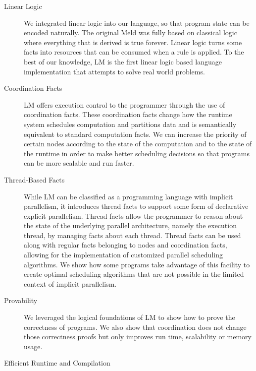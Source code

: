 \begin{description}
   
   \item[Linear Logic]

   We integrated linear logic into our language, so that program state can be
   encoded naturally. The original Meld was fully based on classical logic where
   everything that is derived is true forever. Linear logic turns some facts
   into resources that can be consumed when a rule is applied.  To the best of
   our knowledge, LM is the first linear logic based language implementation
   that attempts to solve real world problems.

   \item[Coordination Facts]
   
   LM offers execution control to the programmer through the use of coordination
   facts. These coordination facts change how the runtime system schedules
   computation and partitions data and is semantically equivalent to standard
   computation facts. We can increase the priority of certain nodes according
   to the state of the computation and to the state of the runtime in order to
   make better scheduling decisions so that programs can be more scalable and
   run faster.

   \item[Thread-Based Facts]

   While LM can be classified as a programming language with implicit
   parallelism, it introduces thread facts to support some form of declarative
   explicit parallelism. Thread facts allow the programmer to reason about the
   state of the underlying parallel architecture, namely the execution thread,
   by managing facts about each thread. Thread facts can be used along with
   regular facts belonging to nodes and coordination facts, allowing for the
   implementation of customized parallel scheduling algorithms. We show how some
   programs take advantage of this facility to create optimal scheduling
   algorithms that are not possible in the limited context of implicit
   parallelism.
   
   \item[Provability]
   
   We leveraged the logical foundations of LM to show how to prove the
   correctness of programs. We also show that coordination does not change those
   correctness proofs but only improves run time, scalability or memory usage.

   \item[Efficient Runtime and Compilation]


\end{description}
